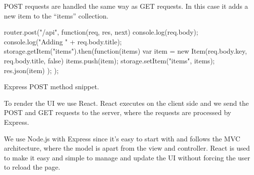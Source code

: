 POST requests are handled the same way as GET requests. 
In this case it adds a new item to the ``items'' collection.

\begin{listing}
    \begin{js}
        router.post("/api", function(req, res, next) {
            console.log(req.body);
            console.log("Adding " + req.body.title);
            storage.getItem("items").then(function(items) {
                var item = new Item(req.body.key, req.body.title, false)
                items.push(item);
                storage.setItem("items", items);
                res.json(item)
            });
        });
    \end{js}
    \caption{Express POST method snippet.}
    \label{lst:express_post}
\end{listing}

To render the UI we use React.
React executes on the client side and we send the POST and GET requests to the server, where the requests are processed by Express.

We use Node.js with Express since it's easy to start with and follows the MVC architecture, where the model is apart from the view and controller.
React is used to make it easy and simple to manage and update the UI without forcing the user to reload the page. 
